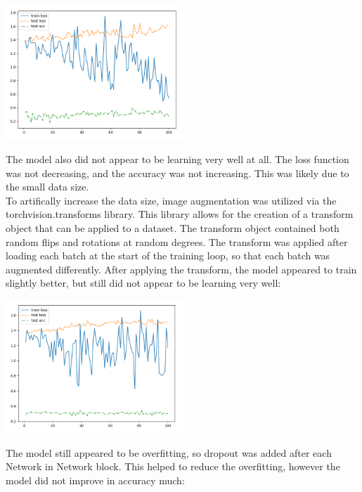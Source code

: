 \documentclass{article}[12pt]
\begin{document}
\begin{center}
    \includegraphics[width=0.5\textwidth]{images/basic_model.png}
\end{center}

\indent
The model also did not appear to be learning very well at all. The loss function was not decreasing, and the accuracy was not increasing. This was likely due to the small data size.\\

\indent
To artifically increase the data size, image augmentation was utilized via the torchvision.transforms library. This library allows for the creation of a transform object that can be applied to a dataset. The transform object contained both random flips and rotations at random degrees. The transform was applied after loading each batch at the start of the training loop, so that each batch was augmented differently. After applying the transform, the model appeared to train slightly better, but still did not appear to be learning very well:\\

\begin{center}
    \includegraphics[width=0.5\textwidth]{images/basic_model_augmented.png}
\end{center}

\indent
The model still appeared to be overfitting, so dropout was added after each Network in Network block. This helped to reduce the overfitting, however the model did not improve in accuracy much:\\
\end{document}
